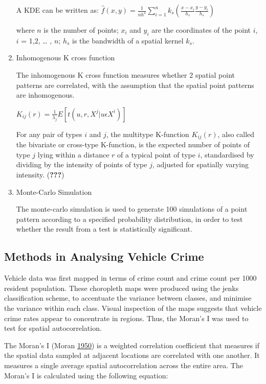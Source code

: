 \documentclass[]{article}
\begin{document}
\begin{enumerate}
  A KDE can be written as:
  \(\hat{f}(x,y)=\frac{1}{nh^2}\sum_{i=1}^nk_s(\frac{x-x_i}{h_s}\frac{y-y_i}{h_s})\)

  where \(n\) is the number of points; \(x_{i}\) and \(y_{i}\) are the
  coordinates of the point \(i\), \(i\) = 1,2, \ldots{} , \(n\);
  \(h_{s}\) is the bandwidth of a spatial kernel \(k_{s}\).
\item
  Inhomogenous K cross function

  The inhomogenous K cross function measures whether 2 spatial point
  patterns are correlated, with the assumption that the spatial point
  patterns are inhomogenous.

  \(K_{ij}(r) = \frac{1}{\lambda_{j}}E[t(u,r,X^{j} | u \epsilon X^{i} )]\)

  For any pair of types \(i\) and \(j\), the multitype K-function
  \(K_{ij}(r)\), also called the bivariate or cross-type K-function, is
  the expected number of points of type \(j\) lying within a distance
  \(r\) of a typical point of type \(i\), standardised by dividing by
  the intensity of points of type \(j\), adjusted for spatially varying
  intensity. ({\textbf{???}})
\item
  Monte-Carlo Simulation

  The monte-carlo simulation is used to generate 100 simulations of a
  point pattern according to a specified probability distribution, in
  order to test whether the result from a test is statistically
  significant.
\end{enumerate}

\subsection{Methods in Analysing Vehicle
Crime}\label{methods-in-analysing-vehicle-crime}

Vehicle data was first mapped in terms of crime count and crime count
per 1000 resident population. These choropleth maps were produced using
the jenks classification scheme, to accentuate the variance between
classes, and minimise the variance within each class. Visual inspection
of the maps suggests that vehicle crime rates appear to concentrate in
regions. Thus, the Moran's I was used to test for spatial
autocorrelation.

The Moran's I (Moran \protect\hyperlink{ref-Moran1950}{1950}) is a
weighted correlation coefficient that measures if the spatial data
sampled at adjacent locations are correlated with one another. It
measures a single average spatial autocorrelation across the entire
area. The Moran's I is calculated using the following equation:
\end{document}
